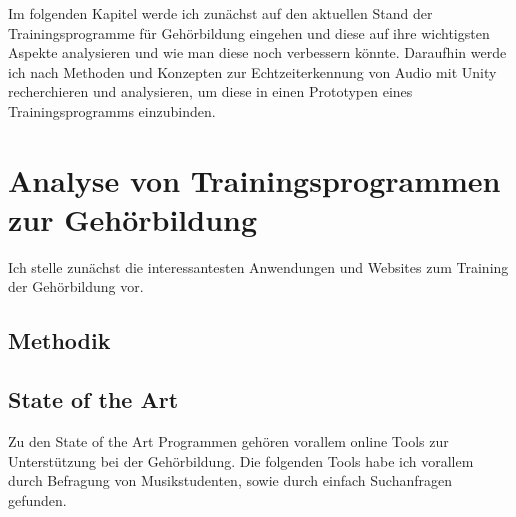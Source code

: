 %
%
Im folgenden Kapitel werde ich zunächst auf den aktuellen Stand der Trainingsprogramme für Gehörbildung eingehen und diese auf ihre wichtigsten Aspekte analysieren und wie man diese noch verbessern könnte. Daraufhin werde ich nach Methoden und Konzepten zur Echtzeiterkennung von Audio mit Unity recherchieren und analysieren, um diese in einen Prototypen eines Trainingsprogramms einzubinden.

\section{Analyse von Trainingsprogrammen zur Gehörbildung}
Ich stelle zunächst die interessantesten Anwendungen und Websites zum Training der Gehörbildung vor.
\subsection{Methodik}
%

\subsection{State of the Art}

Zu den State of the Art Programmen gehören vorallem online Tools zur Unterstützung bei der Gehörbildung. Die folgenden Tools habe ich vorallem durch Befragung von Musikstudenten, sowie durch einfach Suchanfragen gefunden.

